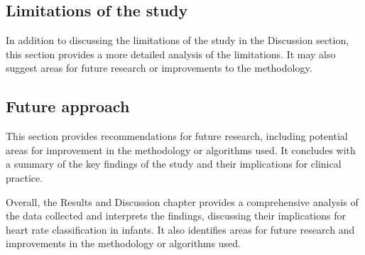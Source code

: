 \subsection{Limitations of the study}\label{sec:limitationsofthestudy}

In addition to discussing the limitations of the study in the Discussion section, this section provides a more detailed analysis of the limitations. It may also suggest areas for future research or improvements to the methodology.

\subsection{Future approach}\label{sec:futureapproach}

This section provides recommendations for future research, including potential areas for improvement in the methodology or algorithms used. It concludes with a summary of the key findings of the study and their implications for clinical practice.

Overall, the Results and Discussion chapter provides a comprehensive analysis of the data collected and interprets the findings, discussing their implications for heart rate classification in infants. It also identifies areas for future research and improvements in the methodology or algorithms used.



